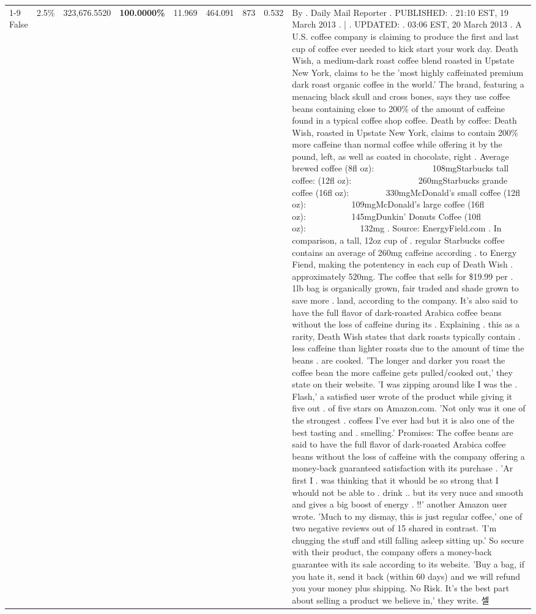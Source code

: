\begin{table}[H]
{\begin{tabular}{lllrlllll}
\cline{1-9}
False & 2.5\% & 323,676.5520 & \bfseries \color{red} 100.0000\% & 11.969 & 464.091 & 873 & 0.532 & By . Daily Mail Reporter . PUBLISHED: . 21:10 EST, 19 March 2013 . | . UPDATED: . 03:06 EST, 20 March 2013 . A U.S. coffee company is claiming to produce the first and last cup of coffee ever needed to kick start your work day. Death Wish, a medium-dark roast coffee blend roasted in Upstate New York, claims to be the 'most highly caffeinated premium dark roast organic coffee in the world.' The brand, featuring a menacing black skull and cross bones, says they use coffee beans containing close to 200\% of the amount of caffeine found in a typical coffee shop coffee. Death by coffee: Death Wish, roasted in Upstate New York, claims to contain 200\% more caffeine than normal coffee while offering it by the pound, left, as well as coated in chocolate, right . Average brewed coffee (8fl oz):              108mgStarbucks tall coffee: (12fl oz):                260mgStarbucks grande coffee (16fl oz):         330mgMcDonald's small coffee (12fl oz):           109mgMcDonald's large coffee (16fl oz):           145mgDunkin' Donuts Coffee (10fl oz):             132mg . Source: EnergyField.com . In comparison, a tall, 12oz cup of . regular Starbucks coffee contains an average of 260mg caffeine according . to Energy Fiend, making the potentency in each cup of Death Wish . approximately 520mg. The coffee that sells for \$19.99 per . 1lb bag is organically grown, fair traded and shade grown to save more . land, according to the company. It's also said to have the full flavor of dark-roasted Arabica coffee beans without the loss of caffeine during its . Explaining . this as a rarity, Death Wish states that dark roasts typically contain . less caffeine than lighter roasts due to the amount of time the beans . are cooked. 'The longer and darker you roast the coffee bean the more caffeine gets pulled/cooked out,' they state on their website. 'I was zipping around like I was the . Flash,' a satisfied user wrote of the product while giving it five out . of five stars on Amazon.com. 'Not only was it one of the strongest . coffees I've ever had but it is also one of the best tasting and . smelling.’ Promises: The coffee beans are said to have the full flavor of dark-roasted Arabica coffee beans without the loss of caffeine with the company offering a money-back guaranteed satisfaction with its purchase . 'Ar first I . was thinking that it whould be so strong that I whould not be able to . drink .. but its very nuce and smooth and gives a big boost of energy . !!' another Amazon user wrote. 'Much to my dismay, this is just regular coffee,' one of two negative reviews out of 15 shared in contrast. 'I'm chugging the stuff and still falling asleep sitting up.' So secure with their product, the company offers a money-back guarantee with its sale according to its website. 'Buy a bag, if you hate it, send it back (within 60 days) and we will refund you your money plus shipping. No Risk. It’s the best part about selling a product we believe in,' they write. 셀 \\

\end{tabular}}
\end{table}
